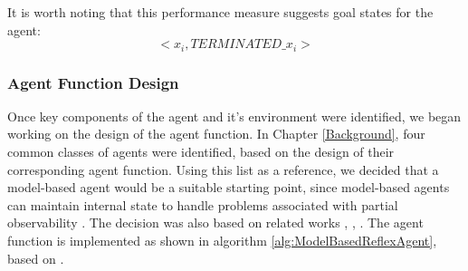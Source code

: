 
It is worth noting that this performance measure suggests goal states for the agent:
\[ <x_i, TERMINATED\_x_i> \]

\subsubsection{Agent Function Design}
Once key components of the agent and it's environment were identified, we began working on the design of the agent function. In Chapter \ref{Background}, four common classes of agents were identified, based on the design of their corresponding agent function. Using this list as a reference, we decided that a model-based agent would be a suitable starting point, since model-based agents can maintain internal state to handle problems associated with partial observability \cite{AIAMA}. The decision was also based on related works \cite{Chung2007ASearchb}, \cite{WaharteProbabilisticUAVsb}, \cite{Charrow2014CooperativeLocalization}. The agent function is implemented as shown in algorithm \ref{alg:ModelBasedReflexAgent}, based on \cite[p.~51]{AIAMA}. 

